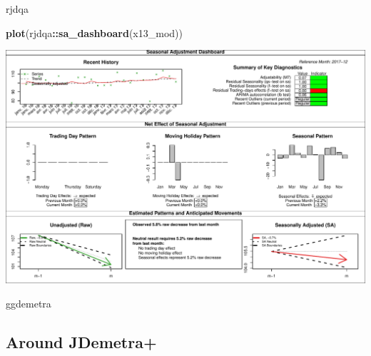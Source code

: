 \documentclass[10pt,xcolor=table,color={dvipsnames,usenames},ignorenonframetext,usepdftitle=false,french]{beamer}
\newenvironment{Shaded}{\begin{snugshade}}{\end{snugshade}}
\newcommand{\KeywordTok}[1]{\textcolor[rgb]{0.13,0.29,0.53}{\textbf{#1}}}
\newcommand{\NormalTok}[1]{#1}
\newcommand{\OperatorTok}[1]{\textcolor[rgb]{0.81,0.36,0.00}{\textbf{#1}}}
\begin{document}
\begin{frame}[fragile]{rjdqa}
\protect\hypertarget{rjdqa}{}

\footnotesize

\begin{Shaded}
\begin{Highlighting}[]
\KeywordTok{plot}\NormalTok{(rjdqa}\OperatorTok{::}\KeywordTok{sa_dashboard}\NormalTok{(x13_mod))}
\end{Highlighting}
\end{Shaded}

\includegraphics{img/markdown-unnamed-chunk-16-1.pdf}

\end{frame}

\begin{frame}{ggdemetra}
\protect\hypertarget{ggdemetra}{}

\end{frame}

\hypertarget{around-jdemetra}{%
\subsection{Around JDemetra+}\label{around-jdemetra}}
\end{document}
